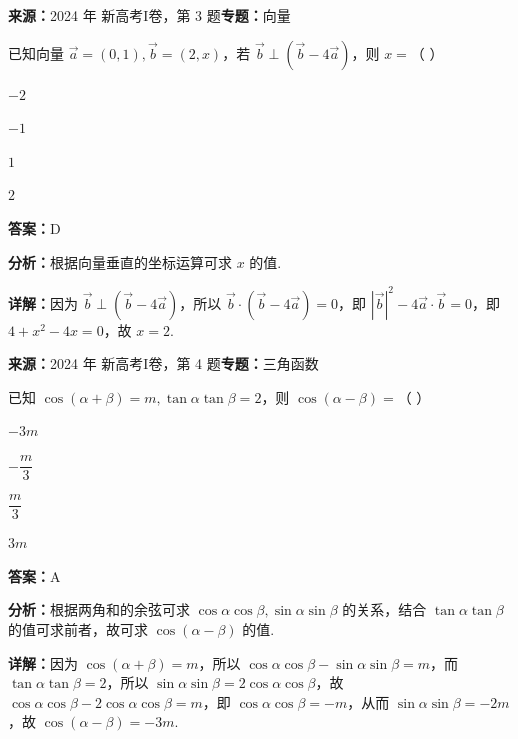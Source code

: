 \begin{question}[points=5]
\textbf{来源：}2024 年 新高考I卷，第 3 题\quad \textbf{专题：}向量\par
已知向量 $\vec{a}=(0,1), \vec{b}=(2,x)$，若 $\vec{b}\perp(\vec{b}-4\vec{a})$，则 $x=$（ ）
\begin{choices}
  \item $-2$
  \item $-1$
  \item $1$
  \item $2$
\end{choices}
\begin{solution}
\textbf{答案：}D

\textbf{分析：}根据向量垂直的坐标运算可求 $x$ 的值.

\textbf{详解：}因为 $\vec{b}\perp(\vec{b}-4\vec{a})$，所以 $\vec{b}\cdot(\vec{b}-4\vec{a})=0$，即 $|\vec{b}|^2-4\vec{a}\cdot\vec{b}=0$，即 $4+x^2-4x=0$，故 $x=2$.
\end{solution}
\end{question}

\begin{question}[points=5]
\textbf{来源：}2024 年 新高考I卷，第 4 题\quad \textbf{专题：}三角函数\par
已知 $\cos(\alpha+\beta)=m, \tan\alpha\tan\beta=2$，则 $\cos(\alpha-\beta)=$（ ）
\begin{choices}
  \item $-3m$
  \item $-\dfrac{m}{3}$
  \item $\dfrac{m}{3}$
  \item $3m$
\end{choices}
\begin{solution}
\textbf{答案：}A

\textbf{分析：}根据两角和的余弦可求 $\cos\alpha\cos\beta,\sin\alpha\sin\beta$ 的关系，结合 $\tan\alpha\tan\beta$ 的值可求前者，故可求 $\cos(\alpha-\beta)$ 的值.

\textbf{详解：}因为 $\cos(\alpha+\beta)=m$，所以 $\cos\alpha\cos\beta-\sin\alpha\sin\beta=m$，而 $\tan\alpha\tan\beta=2$，所以 $\sin\alpha\sin\beta=2\cos\alpha\cos\beta$，故 $\cos\alpha\cos\beta-2\cos\alpha\cos\beta=m$，即 $\cos\alpha\cos\beta=-m$，从而 $\sin\alpha\sin\beta=-2m$，故 $\cos(\alpha-\beta)=-3m$.
\end{solution}
\end{question}


